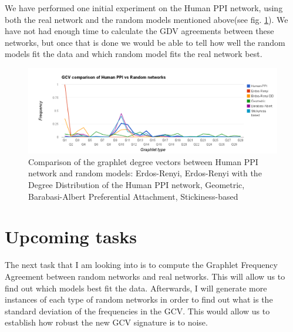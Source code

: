We have performed one initial experiment on the Human PPI network, using both
the real network and the random models mentioned above(see fig.
\ref{fig:avg_gdv_ppi_random}). We have not had
enough time to calculate the GDV agreements between these networks, but once
that is done we would be able to tell how well the random models fit the data
and which random model fits the real network best. 

\begin{figure}[h]
  \centering
\includegraphics[scale=0.4]{charts/2-avg-norm-ppi-vs-random.png}
\caption{Comparison of the graphlet degree vectors between Human PPI network
and random models: Erdos-Renyi, Erdos-Renyi with the Degree Distribution of the
Human PPI network, Geometric, Barabasi-Albert Preferential Attachment,
Stickiness-based}
\label{fig:avg_gdv_ppi_random}
\end{figure}

  
\section{Upcoming tasks}

The next task that I am looking into is to compute the Graphlet Frequency
Agreement between random networks and real networks. This will allow us to find
out which models best fit the data. Afterwards, I will generate more instances
of each type of random networks in order to find out what is the standard
deviation of the frequencies in the GCV. This would allow us to establish how
robust the new GCV signature is to noise.